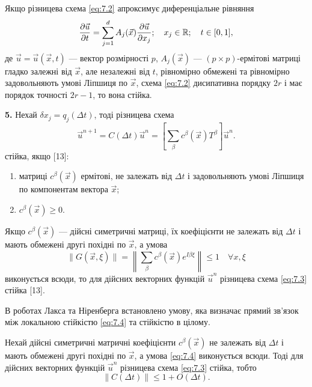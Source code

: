 \begin{theorem}
    [13] Якщо різницева схема \eqref{eq:7.2} апроксимує диференціальне рівняння 
    \begin{equation*}
        \frac{\partial \vec u}{\partial t} = \sum_{j = 1}^d A_j(\vec x) \frac{\partial \vec u}{\partial x_j}; \quad x_j \in \RR; \quad t \in [0, 1],
    \end{equation*}
    де $\vec u = \vec u(\vec x, t)$ --- вектор розмірності $p$, $A_j(\vec x)$ --- $(p \times p)$-ермітові матриці гладко залежні від $\vec x$, але незалежні від $t$, рівномірно обмежені та рівномірно задовольняють умові Ліпшиця по $\vec x$, схема \eqref{eq:7.2} дисипативна порядку $2r$ і має порядок точності $2r - 1$, то вона стійка.
\end{theorem}

\textbf{5.} Нехай $\delta x_j = q_j(\Delta t)$, тоді різницева схема 
\begin{equation}
    \label{eq:7.3}
    \vec u^{n + 1} = C(\Delta t) \vec u^n = \left[ \sum_\beta c^\beta(\vec x) T^\beta \right] \vec u^n.
\end{equation}
стійка, якщо [13]:
\begin{enumerate}
    \item матриці $c^\beta(\vec x)$ ермітові, не залежать від $\Delta t$ і задовольняють умові Ліпшиця по компонентам вектора $\vec x$; 
    \item $c^\beta(\vec x) \ge 0$. 
\end{enumerate}

\begin{theorem}
    Якщо $c^\beta(\vec x)$ --- дійсні симетричні матриці, їх коефіцієнти не залежать від $\Delta t$ і мають обмежені другі похідні по $\vec x$, а умова 
    \begin{equation}
        \label{eq:7.4}
        \|G(\vec x, \xi)\| = \left\| \sum_\beta c^\beta(\vec x) e^{I \beta \xi} \right\| \le 1 \quad \forall x, \xi
    \end{equation}
    виконується всюди, то для дійсних векторних функцій $\vec u^n$ різницева схема \eqref{eq:7.3} стійка [13].
\end{theorem}

В роботах Лакса та Ніренберга встановлено умову, яка визначає прямий зв'язок між локальною стійкістю \eqref{eq:7.4} та стійкістю в цілому.

\begin{theorem}
    Нехай дійсні симетричні матричні коефіцієнти $c^\beta(\vec x)$ не залежать від $\Delta t$ і мають обмежені другі похідні по $\vec x$, а умова \eqref{eq:7.4} виконується всюди. Тоді для дійсних векторних функцій $\vec u^n$ різницева схема \eqref{eq:7.3} стійка, тобто 
    \begin{equation*}
        \|C(\Delta t)\| \le 1 + O(\Delta t).
    \end{equation*}
\end{theorem}

